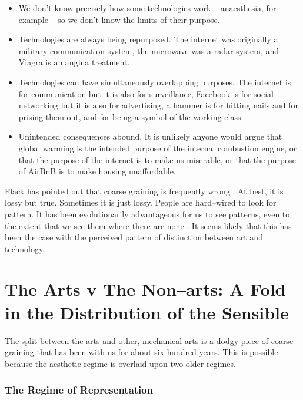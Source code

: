 \documentclass[letter:wpaper]{article}
\begin{document}
    \begin{itemize}
     
        \item We don't know precisely how some technologies work – anaesthesia, for example – so we don't know the limits of their purpose.
    
        \item Technologies are always being repurposed. The internet was originally a military communication system, the microwave was a radar system, and Viagra is an angina treatment.

        \item Technologies can have simultaneously overlapping purposes. The internet is for communication but it is also for surveillance, Facebook is for social networking but it is also for advertising, a hammer is for hitting nails and for prising them out, and for being a symbol of the working class.

        \item Unintended consequences abound. It is unlikely anyone would argue that global warming is the intended purpose of the internal combustion engine, or that the purpose of the internet is to make us miserable, or that the purpose of AirBnB is to make housing unaffordable.
    \end{itemize}

    Flack has pointed out that coarse graining is frequently wrong \citep[p.8]{FlackCrsGrnng2017}. At best, it is lossy but true. Sometimes it is just lossy. People are hard–wired to look for pattern. It has been evolutionarily advantageous for us to see patterns, even to the extent that we see them where there are none \citep{FristonThFrEnrgPrncpl2010}. It seems likely that this has been the case with the perceived pattern of distinction between art and technology.

\section{The Arts v The Non–arts: A Fold in the Distribution of the Sensible}
    
    The split between the arts and other, mechanical arts is a dodgy piece of coarse graining that has been with us for about six hundred years. This is possible because the aesthetic regime is overlaid upon two older regimes. 
    
    \subsubsection{The Regime of Representation}
\end{document}

